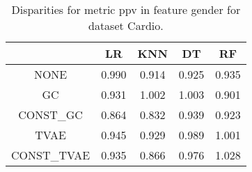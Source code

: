\begin{table}
\caption{Disparities for metric ppv in feature gender for dataset Cardio.}
\label{tab:disp-CARDIO-gender-ppv}
\begin{tabular}{ccccc}
\toprule
 & LR & KNN & DT & RF \\
\midrule
NONE & 0.990 & 0.914 & 0.925 & 0.935 \\
GC & 0.931 & 1.002 & 1.003 & 0.901 \\
CONST\_GC & 0.864 & 0.832 & 0.939 & 0.923 \\
TVAE & 0.945 & 0.929 & 0.989 & 1.001 \\
CONST\_TVAE & 0.935 & 0.866 & 0.976 & 1.028 \\
\bottomrule
\end{tabular}
\end{table}
